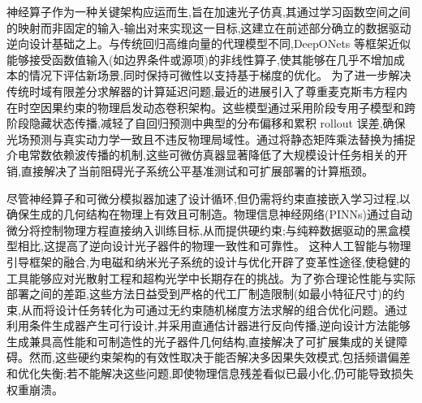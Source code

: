 \documentclass[11pt]{article}
\begin{document}
神经算子作为一种关键架构应运而生,旨在加速光子仿真,其通过学习函数空间之间的映射而非固定的输入-输出对来实现这一目标,这建立在前述部分确立的数据驱动逆向设计基础之上。与传统回归高维向量的代理模型不同,DeepONets 等框架近似能够接受函数值输入(如边界条件或源项)的非线性算子,使其能够在几乎不增加成本的情况下评估新场景,同时保持可微性以支持基于梯度的优化。\citep{doi_10_48550_arxiv_2406_05072_c02ad5f4} \citep{doi_10_1122_8_0000908_e28c4124} 为了进一步解决传统时域有限差分求解器的计算延迟问题,最近的进展引入了尊重麦克斯韦方程内在时空因果约束的物理启发动态卷积架构。这些模型通过采用阶段专用子模型和跨阶段隐藏状态传播,减轻了自回归预测中典型的分布偏移和累积 rollout 误差,确保光场预测与真实动力学一致且不违反物理局域性。通过将静态矩阵乘法替换为捕捉介电常数依赖波传播的机制,这些可微仿真器显著降低了大规模设计任务相关的开销,直接解决了当前阻碍光子系统公平基准测试和可扩展部署的计算瓶颈。\citep{doi_10_48550_arxiv_2601_00199_c689b34d} \citep{doi_10_48550_arxiv_2406_17810_813bd2a3}

尽管神经算子和可微分模拟器加速了设计循环,但仍需将约束直接嵌入学习过程,以确保生成的几何结构在物理上有效且可制造。物理信息神经网络(PINNs)通过自动微分将控制物理方程直接纳入训练目标,从而提供硬约束;与纯粹数据驱动的黑盒模型相比,这提高了逆向设计光子器件的物理一致性和可靠性。\citep{doi_10_48550_arxiv_2606_12337_68b62bfa} \citep{doi_10_48550_arxiv_2603_09359_098af542} 这种人工智能与物理引导框架的融合,为电磁和纳米光子系统的设计与优化开辟了变革性途径,使稳健的工具能够应对光散射工程和超构光学中长期存在的挑战。为了弥合理论性能与实际部署之间的差距,这些方法日益受到严格的代工厂制造限制(如最小特征尺寸)的约束,从而将设计任务转化为可通过无约束随机梯度方法求解的组合优化问题。通过利用条件生成器产生可行设计,并采用直通估计器进行反向传播,逆向设计方法能够生成兼具高性能和可制造性的光子器件几何结构,直接解决了可扩展集成的关键障碍。然而,这些硬约束架构的有效性取决于能否解决多因果失效模式,包括频谱偏差和优化失衡;若不能解决这些问题,即使物理信息残差看似已最小化,仍可能导致损失权重崩溃。\citep{s2_cc39d5405a933620426d86298fa8fe4cd51915c5_27626ee3} \citep{s2_037e66f37189104d61c0d000de0cee202b7eec9e_d15b8018} \citep{doi_10_1021_acsphotonics_2c00313_0d7d39c3}
\end{document}
